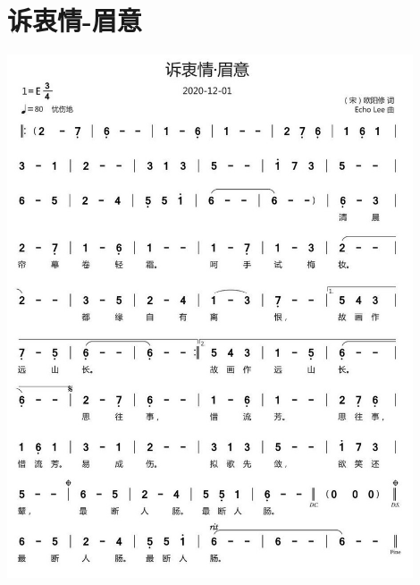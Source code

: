 \documentclass[cn,pad,twocol]{elegantbook}
\begin{document}
\section{诉衷情-眉意} \includegraphics[width=0.9\textwidth]{rpi400/20210212欧阳修-诉衷情眉意.jpg}
\end{document}
